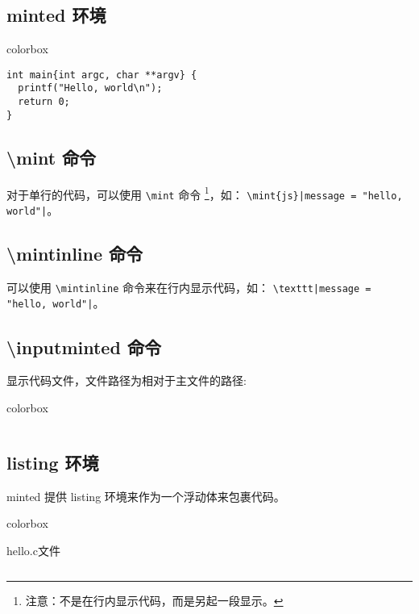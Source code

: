 \subsection{{\ttfamily minted} 环境}

\begin{latexcode}{colorbox}
\begin{verbatim}
int main{int argc, char **argv} {
  printf("Hello, world\n");
  return 0;
}
\end{verbatim}
\end{latexcode}

\subsection{{\ttfamily \textbackslash mint} 命令}

对于单行的代码，可以使用 \verb|\mint| 命令
\footnote{注意：不是在行内显示代码，而是另起一段显示。}，如：
\verb!\mint{js}|message = "hello, world"|!。

\subsection{{\ttfamily \textbackslash mintinline} 命令}

可以使用 \verb|\mintinline| 命令来在行内显示代码，如：
\verb!\texttt|message = "hello, world"|!。

\subsection{{\ttfamily \textbackslash inputminted} 命令}

显示代码文件，文件路径为相对于主文件的路径:

\begin{latexcode}{colorbox}
\inputminted{c}{snippets/codelistings/helloworld.c}
\end{latexcode}

\subsection{{\ttfamily listing} 环境}

minted 提供 {\ttfamily listing} 环境来作为一个浮动体来包裹代码。

\begin{latexcode}{colorbox}
\begin{listing}[H]
  \caption{hello.c文件}
  \inputminted{c}{snippets/codelistings/helloworld.c}
\end{listing}
\end{latexcode}

